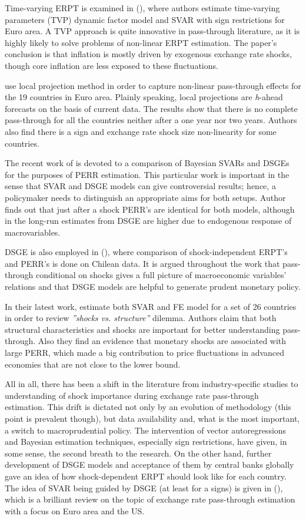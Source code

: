 \documentclass[12pt, a4paper]{extarticle}
\begin{document}
Time-varying ERPT is examined in (\cite{LeivaLeon2019}), where authors estimate time-varying parameters (TVP) dynamic factor model and SVAR with sign restrictions for Euro area. A TVP approach is quite innovative in pass-through literature, as it is highly likely to solve problems of non-linear ERPT estimation. The paper's conclusion is that inflation is mostly driven by exogenous exchange rate shocks, though core inflation are less exposed to these fluctuations.

\textcite{Colavecchio2019} use local projection method in order to capture non-linear pass-through effects for the 19 countries in Euro area. Plainly speaking, local projections are \textit{h}-ahead forecasts on the basis of current data. The results show that there is no complete pass-through for all the countries neither after a one year nor two years. Authors also find there is a sign and exchange rate shock size non-linearity for some countries.

The recent work of \textcite{Comunale2020} is devoted to a comparison of Bayesian SVARs and DSGEs for the purposes of PERR estimation. This particular work is important in the sense that SVAR and DSGE models can give controversial results; hence, a policymaker needs to distinguish an appropriate aims for both setups. Author finds out that just after a shock PERR's are identical for both models, although in the long-run estimates from DSGE are higher due to endogenous response of macrovariables. 

DSGE is also employed in (\cite{GarciaCicco2020}), where comparison of shock-independent ERPT's and PERR's is done on Chilean data. It is argued throughout the work that pass-through conditional on shocks gives a full picture of macroeconomic variables' relations and that DSGE models are helpful to generate prudent monetary policy. 

In their latest work, \textcite{Forbes2020} estimate both SVAR and FE model for a set of 26 countries in order to review \textit{''shocks vs. structure''} dilemma. Authors claim that both structural characteristics and shocks are important for better understanding pass-through. Also they find an evidence that monetary shocks are associated with large PERR, which made a big contribution to price fluctuations in advanced economies that are not close to the lower bound.

All in all, there has been a shift in the literature from industry-specific studies to understanding of shock importance during exchange rate pass-through estimation. This drift is dictated not only by an evolution of methodology (this point is prevalent though), but data availability and, what is the most important, a switch to macroprudential policy. The intervention of vector autoregressions and Bayesian estimation techniques, especially sign restrictions, have given, in some sense, the second breath to the research. On the other hand, further development of DSGE models and acceptance of them by central banks globally gave an idea of how shock-dependent ERPT should look like for each country. The idea of SVAR being guided by DSGE (at least for a signs) is given in (\cite{Ortega2020}), which is a brilliant review on the topic of exchange rate pass-through estimation with a focus on Euro area and the US.
\end{document}
